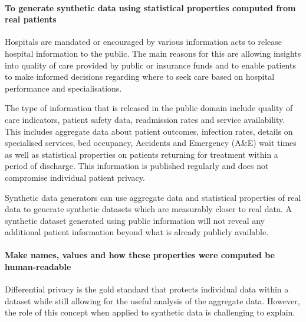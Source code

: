 \documentclass[11pt]{article}
\begin{document}
\paragraph{To generate synthetic data using statistical properties computed from real patients}
Hospitals are mandated or encouraged by various information acts to release hospital information to the public. The main reasons for this are allowing insights into quality of care provided by public or insurance funds and to enable patients to make informed decisions regarding where to seek care based on hospital performance and specialisations\cite{Werner2005}. 

The type of information that is released in the public domain include quality of care indicators, patient safety data, readmission rates and service availability. This includes aggregate data about patient outcomes, infection rates, details on specialised services, bed occupancy, Accidents and Emergency (A\&E) wait times as well as statistical properties on patients returning for treatment within a period of discharge. This information is published regularly and does not compromise individual patient privacy.  

Synthetic data generators can use aggregate data and statistical properties of real data to generate synthetic datasets which are measurably closer to real data. A synthetic dataset generated using public information will not reveal any additional patient information beyond what is already publicly available.

\paragraph{Make names, values and how these properties were computed be human-readable}


    


Differential privacy is the gold standard that protects individual data within a dataset while still allowing for the useful analysis of the aggregate data. However, the role of this concept when applied to synthetic data is challenging to explain. 
\end{document}
